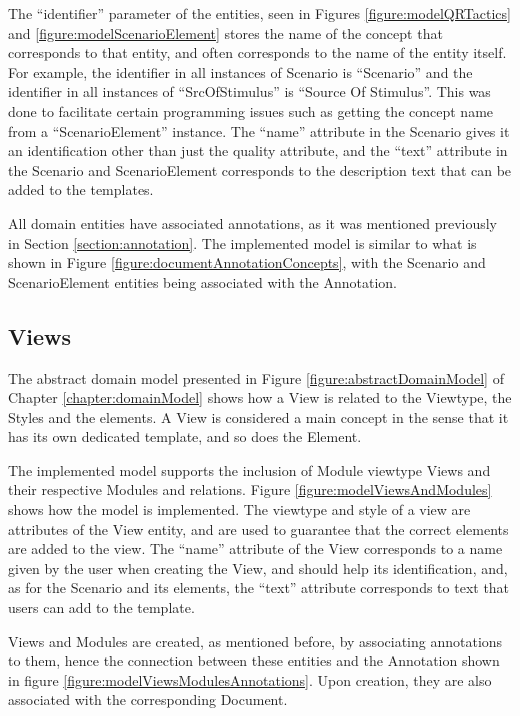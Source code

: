 The ``identifier'' parameter of the entities, seen in  Figures \ref{figure:modelQRTactics} and \ref{figure:modelScenarioElement} stores the name of the concept that corresponds to that entity, and often corresponds to the name of the entity itself. For example, the identifier in all instances of Scenario is ``Scenario'' and the identifier in all instances of ``SrcOfStimulus'' is ``Source Of Stimulus''. This was done to facilitate certain programming issues such as getting the concept name from a ``ScenarioElement'' instance. The ``name'' attribute in the Scenario gives it an identification other than just the quality attribute, and the ``text'' attribute in the Scenario and ScenarioElement corresponds to the description text that can be added to the templates.

All domain entities have associated annotations, as it was mentioned previously in Section \ref{section:annotation}. The implemented model is similar to what is shown in Figure \ref{figure:documentAnnotationConcepts}, with the Scenario and ScenarioElement entities being associated with the Annotation.

\subsection{Views}
\label{subsection:modelViews}

The abstract domain model presented in Figure \ref{figure:abstractDomainModel} of Chapter \ref{chapter:domainModel} shows how a View is related to the Viewtype, the Styles and the elements. A View is considered a main concept in the sense that it has its own dedicated template, and so does the Element.

The implemented model supports the inclusion of Module viewtype Views and their respective Modules and relations. Figure \ref{figure:modelViewsAndModules} shows how the model is implemented. The viewtype and style of a view are attributes of the View entity, and are used to guarantee that the correct elements are added to the view. The ``name'' attribute of the View corresponds to a name given by the user when creating the View, and should help its identification, and, as for the Scenario and its elements, the ``text'' attribute corresponds to text that users can add to the template.

Views and Modules are created, as mentioned before, by associating annotations to them, hence the connection between these entities and the Annotation shown in figure \ref{figure:modelViewsModulesAnnotations}. Upon creation, they are also associated with the corresponding Document.

